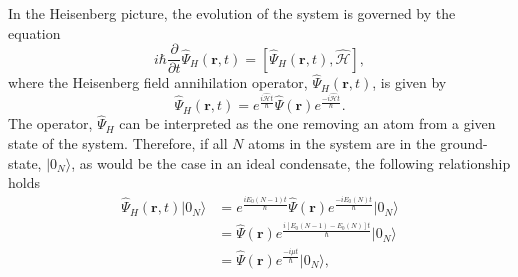 In the Heisenberg picture, the evolution of the system is governed by the equation
\begin{equation}\label{eqn:heisenberg}
i\hbar \frac{\partial}{\partial t}\hat{\Psi}_H\left(\textbf{r}, t\right) = \left[\hat{\Psi}_{H}\left(\textbf{r}, t\right), \hat{\mathcal{H}}  \right],
\end{equation}
where the Heisenberg field annihilation operator, $\hat{\Psi}_H\left(\textbf{r}, t\right)$, is given by
\begin{equation}\label{eqn:psi_heisenberg}
\hat{\Psi}_H\left(\textbf{r}, {t} \right) = e^{\frac{i\hat{\mathcal{H}}t}{\hbar}}\hat{\Psi}\left(\textbf{r}\right) e^{\frac{-i\hat{\mathcal{H}}t}{\hbar}}.
\end{equation}
The operator, $\hat{\Psi}_H$ can be interpreted as the one removing an atom from a given state of the system. Therefore, if all $N$ atoms in the system are in the ground-state, $\vert 0_N\rangle$, as would be the case in an ideal condensate, the following relationship holds
\begin{subequations}
\begin{align}
\hat{\Psi}_{H}(\textbf{r},t)\vert 0_N \rangle &= e^{\frac{iE_0(N-1)t}{\hbar}}\hat{\Psi}(\textbf{r})e^{\frac{-iE_0(N)t}{\hbar}}\vert 0_N \rangle \\
&= \hat{\Psi}(\textbf{r})e^{\frac{i[E_0(N-1) - E_0(N)]t}{\hbar}} \vert 0_N \rangle \\
&= \hat{\Psi}(\textbf{r})e^{\frac{-i\mu t}{\hbar}} \vert 0_N \rangle,\label{eqn:psi_dagger_time} \label{eqn:stationary_soln}
\end{align}
\end{subequations}

